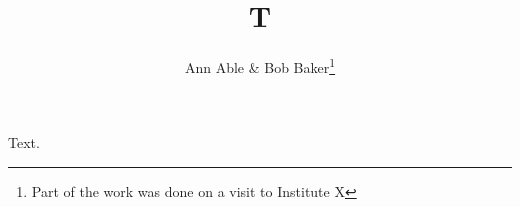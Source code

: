 \documentclass{llncs}
\begin{document}
\title{T}
\author{Ann Able \& Bob Baker\thanks{Part of the work was done on a visit to Institute X}}
\maketitle
Text.
\end{document}
